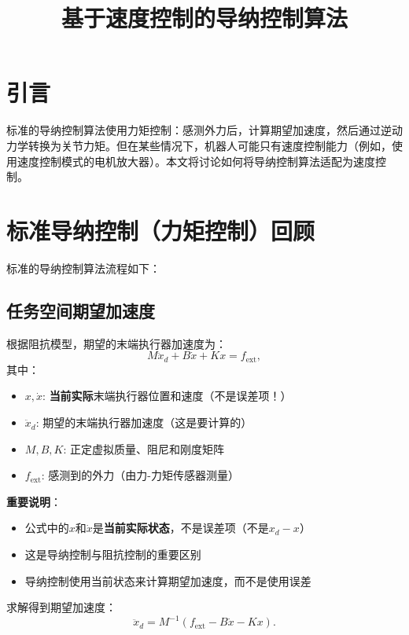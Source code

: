 \documentclass[12pt,a4paper]{article}
\title{基于速度控制的导纳控制算法}
\author{}
\date{}
\begin{document}
\maketitle

\section{引言}

标准的导纳控制算法使用力矩控制：感测外力后，计算期望加速度，然后通过逆动力学转换为关节力矩。但在某些情况下，机器人可能只有速度控制能力（例如，使用速度控制模式的电机放大器）。本文将讨论如何将导纳控制算法适配为速度控制。

\section{标准导纳控制（力矩控制）回顾}

标准的导纳控制算法流程如下：

\subsection{任务空间期望加速度}

根据阻抗模型，期望的末端执行器加速度为：
\begin{equation}
M\ddot{x}_d + B\dot{x} + Kx = f_{\text{ext}},
\end{equation}
其中：
\begin{itemize}
\item $x, \dot{x}$: \textbf{当前实际}末端执行器位置和速度（不是误差项！）
\item $\ddot{x}_d$: 期望的末端执行器加速度（这是要计算的）
\item $M, B, K$: 正定虚拟质量、阻尼和刚度矩阵
\item $f_{\text{ext}}$: 感测到的外力（由力-力矩传感器测量）
\end{itemize}

\textbf{重要说明}：
\begin{itemize}
\item 公式中的$x$和$\dot{x}$是\textbf{当前实际状态}，不是误差项（不是$x_d - x$）
\item 这是导纳控制与阻抗控制的重要区别
\item 导纳控制使用当前状态来计算期望加速度，而不是使用误差
\end{itemize}

求解得到期望加速度：
\begin{equation}
\ddot{x}_d = M^{-1}(f_{\text{ext}} - B\dot{x} - Kx). \tag{11.66}
\end{equation}
\end{document}

